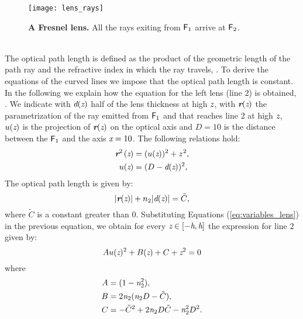 \begin{figure}[t]
  \begin{center}
  \texttt{[image: lens\_rays]}
  \end{center}
  \caption{\textbf{A Fresnel lens.} 
All the rays exiting from $\textsf{F}_1$ arrive at $\textsf{F}_2$.}
\label{fig:real-lens}
 \end{figure}
\\ \indent The optical path length is defined as the product of the geometric length of the path ray and the refractive index in which the ray travels, \cite{greivenkamp2004field}.
To derive the equations of the curved lines we impose that the optical path length is constant. In the following we explain how the equation for the left lens (line $2$) is obtained, \cite{greivenkamp2004field}. We indicate with $\textit{d}(\textit{z})$ half of the lens thickness at high $\textit{z}$, with $\textit{\textbf{r}}(\textit{z})$ the parametrization of the ray emitted from $\textsf{F}_1$ and that reaches line $2$ at high $\textit{z}$, $u(\textit{z})$ is the projection of $\textit{\textbf{r}}(\textit{z})$ on the optical axis and $D=10$ is the distance between the $\textsf{F}_1$ and the axis $\textit{x}=10$.
The following relations hold:
\begin{equation}\label{eq:variables_lens}
\begin{aligned}
\textit{\textbf{r}}^{2\,}(\textit{z}) &= (u(\textit{z}))^2+\textit{z}^{\,2},\\
u(\textit{z}) &= (D-\textit{d}(\textit{z}))^2, 
\end{aligned}
\end{equation}
The optical path length is given by:
\begin{equation}\label{eq:path_length}
|\textit{\textbf{r}}(\textit{z})|+n_2|\textit{d}(\textit{z})|=\tilde{C},
\end{equation}  
where $\tilde{C}$ is a constant greater than $0$. Substituting Equations (\ref{eq:variables_lens}) in the previous equation,
we obtain for every $\textit{z}\in[-\textit{h}, \textit{h}]$ the expression for line $2$ given by:
\begin{equation}
Au(\textit{z})^2+B(\textit{z})+C+\textit{z}^2 = 0
\end{equation}
where 
\begin{equation}
\begin{aligned}
A & = (1-\textit{n}_2^2), \\
B & = 2\textit{n}_2(\textit{n}_2 D-\tilde{C}), \\
C & = -\tilde{C}^2+2\textit{n}_2 D\tilde{C}-\textit{n}_2^2D^2. \\
\end{aligned}
\end{equation}
